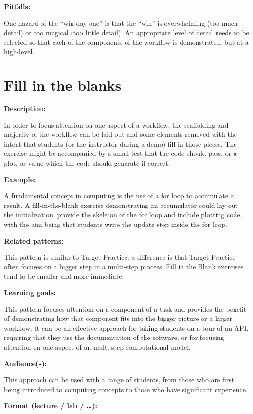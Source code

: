 \documentclass[]{book}
\begin{document}
\textbf{Pitfalls:}

One hazard of the ``win-day-one'' is that the ``win'' is overwhelming
(too much detail) or too magical (too little detail). An appropriate
level of detail needs to be selected so that each of the components of
the workflow is demonstrated, but at a high-level.

\section{Fill in the blanks}\label{fill-in-the-blanks}

\textbf{Description:}

In order to focus attention on one aspect of a workflow, the scaffolding
and majority of the workflow can be laid out and some elements removed
with the intent that students (or the instructor during a demo) fill in
those pieces. The exercise might be accompanied by a small test that the
code should pass, or a plot, or value which the code should generate if
correct.

\textbf{Example:}

A fundamental concept in computing is the use of a for loop to
accumulate a result. A fill-in-the-blank exercise demonstrating an
accumulator could lay out the initialization, provide the skeleton of
the for loop and include plotting code, with the aim being that students
write the update step inside the for loop.

\textbf{Related patterns:}

This pattern is similar to Target Practice; a difference is that Target
Practice often focuses on a bigger step in a multi-step process. Fill in
the Blank exercises tend to be smaller and more immediate.

\textbf{Learning goals:}

This pattern focuses attention on a component of a task and provides the
benefit of demonstrating how that component fits into the bigger picture
or a larger workflow. It can be an effective approach for taking
students on a tour of an API, requiring that they use the documentation
of the software, or for focusing attention on one aspect of an
multi-step computational model.

\textbf{Audience(s):}

This approach can be used with a range of students, from those who are
first being introduced to computing concepts to those who have
significant experience.

\textbf{Format (lecture / lab / \ldots{}):}
\end{document}
